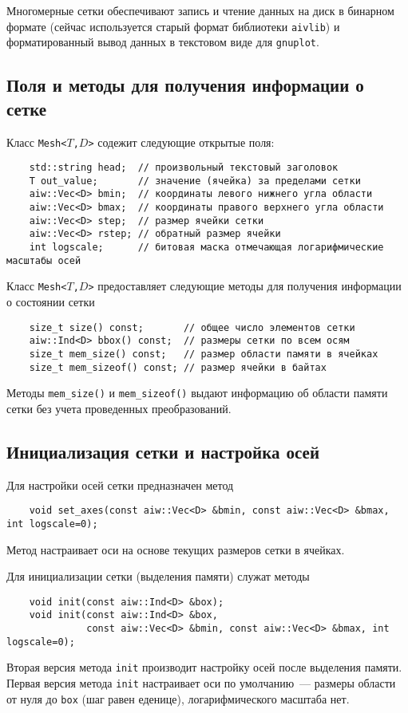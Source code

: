 Многомерные сетки обеспечивают запись и чтение данных на диск в бинарном формате (сейчас используется старый 
формат библиотеки {\tt aivlib}) и форматированный вывод данных в текстовом виде для {\tt gnuplot}. 

\subsection{Поля и методы для получения информации о сетке}
Класс {\tt Mesh<$T$,$D$>} содежит следующие открытые поля:
\begin{verbatim}
    std::string head;  // произвольный текстовый заголовок
    T out_value;       // значение (ячейка) за пределами сетки
    aiw::Vec<D> bmin;  // координаты левого нижнего угла области
    aiw::Vec<D> bmax;  // координаты правого верхнего угла области
    aiw::Vec<D> step;  // размер ячейки сетки
    aiw::Vec<D> rstep; // обратный размер ячейки
    int logscale;      // битовая маска отмечающая логарифмические масштабы осей
\end{verbatim}

Класс {\tt Mesh<$T$,$D$>} предоставляет следующие методы для получения информации о состоянии сетки
\begin{verbatim}
    size_t size() const;       // общее число элементов сетки
    aiw::Ind<D> bbox() const;  // размеры сетки по всем осям
    size_t mem_size() const;   // размер области памяти в ячейках
    size_t mem_sizeof() const; // размер ячейки в байтах
\end{verbatim}
Методы \verb'mem_size()' и \verb'mem_sizeof()' выдают информацию об области памяти сетки без учета
проведенных преобразований. 

\subsection{Инициализация сетки и настройка осей}
Для настройки осей сетки предназначен метод
\begin{verbatim}
    void set_axes(const aiw::Vec<D> &bmin, const aiw::Vec<D> &bmax, int logscale=0);
\end{verbatim}
Метод настраивает оси на основе текущих размеров сетки в ячейках.

Для инициализации сетки (выделения памяти) служат методы 
\begin{verbatim}
    void init(const aiw::Ind<D> &box);
    void init(const aiw::Ind<D> &box, 
              const aiw::Vec<D> &bmin, const aiw::Vec<D> &bmax, int logscale=0);
\end{verbatim}
Вторая версия метода \verb'init' производит настройку осей после выделения памяти.
Первая версия метода \verb'init' настраивает оси по умолчанию~--- размеры области от нуля до \verb'box' 
(шаг равен еденице), логарифмического масштаба нет.

